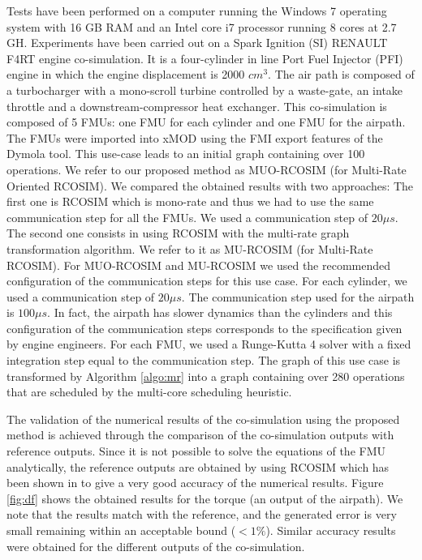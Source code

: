 Tests have been performed on a computer running the Windows 7 operating system with 16 GB RAM and an Intel core i7 processor running 8 cores at 2.7 GH. Experiments have been carried out on a Spark Ignition (SI) RENAULT F4RT engine co-simulation. It is a four-cylinder in line Port Fuel Injector (PFI) engine in which the engine displacement is 2000 $cm^3$. The air path is composed of a turbocharger with a mono-scroll turbine controlled by a waste-gate, an intake throttle and a downstream-compressor heat exchanger. This co-simulation is composed of 5 FMUs: one FMU for each cylinder and one FMU for the airpath. The FMUs were imported into xMOD using the FMI export features of the Dymola tool. This use-case leads to an initial graph containing over 100 operations. We refer to our proposed method as MUO-RCOSIM (for Multi-Rate Oriented RCOSIM). We compared the obtained results with two approaches: The first one is RCOSIM which is mono-rate and thus we had to use the same communication step for all the FMUs. We used a communication step of $20 {\mu}s$. The second one consists in using RCOSIM with the multi-rate graph transformation algorithm. We refer to it as MU-RCOSIM (for Multi-Rate RCOSIM). For MUO-RCOSIM and MU-RCOSIM we used the recommended configuration of the communication steps for this use case. For each cylinder, we used a communication step of $20 {\mu}s$. The communication step used for the airpath is $100 {\mu}s$. In fact, the airpath has slower dynamics than the cylinders and this configuration of the communication steps corresponds to the specification given by engine engineers. For each FMU, we used a Runge-Kutta 4 solver with a fixed integration step equal to the communication step. The graph of this use case is transformed by Algorithm \ref{algo:mr} into a graph containing over 280 operations that are scheduled by the multi-core scheduling heuristic.      

The validation of the numerical results of the co-simulation using the proposed method is achieved through the comparison of the co-simulation outputs with reference outputs. Since it is not possible to solve the equations of the FMU analytically, the reference outputs are obtained by using RCOSIM which has been shown in \cite{benkhaled:2014} to give a very good accuracy of the numerical results. Figure \ref{fig:df} shows the obtained results for the torque (an output of the airpath). We note that the results match with the reference, and the generated error is very small remaining within an acceptable bound ($< 1\%$). Similar accuracy results were obtained for the different outputs of the co-simulation.


